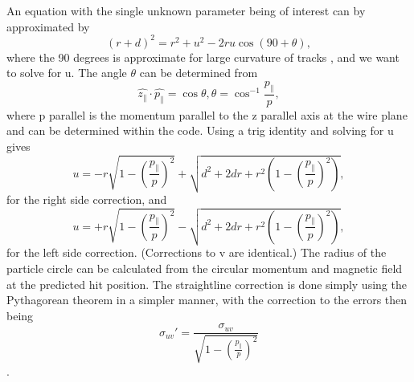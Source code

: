 An equation with the single unknown parameter being of interest can by approximated by
$$(r+d)^{2} = r^{2}+u^{2}-2ru\cos(90+\theta),$$ where the 90 degrees is approximate for large curvature of tracks , and we want to solve for u. The angle $\theta$ can be determined from 
$$\hat{z_{\parallel}} \cdot \hat{p_{\parallel}} = \cos{\theta}, \theta = \cos^{-1}{\frac{p_{\parallel}}{p}},$$ where p parallel is the momentum parallel to the z parallel axis at the wire plane and can be determined within the code. Using a trig identity and solving for u gives
$$u = -r\sqrt{1-(\frac{p_{\parallel}}{p})^{2}} + \sqrt{d^{2} + 2dr + r^{2}(1-(\frac{p_{\parallel}}{p})^{2})},$$ for the right side correction, and 
$$u = +r\sqrt{1-(\frac{p_{\parallel}}{p})^{2}} - \sqrt{d^{2} + 2dr + r^{2}(1-(\frac{p_{\parallel}}{p})^{2})},$$ for the left side correction. (Corrections to v are identical.) The radius of the particle circle can be calculated from the circular momentum and magnetic field at the predicted hit position. The straightline correction is done simply using the Pythagorean theorem in a simpler manner, with the correction to the errors then being
$$\sigma_{uv}' = \frac{\sigma_{uv}}{\sqrt{1-(\frac{p_{\parallel}}{p})^{2}}}$$.

